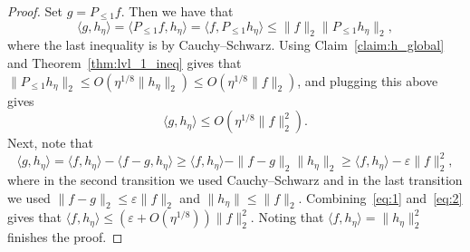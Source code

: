 \documentclass[11pt]{article}
\newcommand\norm[1]{\| #1 \|}
\newcommand\inner[2]{\langle{#1},{#2}\rangle}
\newcommand\eps{\varepsilon}
\renewcommand\geq{\geqslant}
\renewcommand\leq{\leqslant}
\begin{document}
\begin{proof}
    Set $g=P_{\leq 1} f$. Then we have that
    \[
    \inner{g}{h_{\eta}}
    =\inner{P_{\leq 1} f}{h_{\eta}}
    =\inner{f}{P_{\leq 1} h_{\eta}}
    \leq \norm{f}_2\norm{P_{\leq 1}h_{\eta}}_2,
    \]
    where the last inequality is by Cauchy--Schwarz. Using Claim~\ref{claim:h_global} and Theorem~\ref{thm:lvl_1_ineq} gives that 
    $\norm{P_{\leq 1}h_{\eta}}_2\leq O(\eta^{1/8}\norm{h_{\eta}}_2)
    \leq O(\eta^{1/8}\norm{f}_2)$, and plugging this above gives
    \begin{equation}\label{eq:1}
    \inner{g}{h_{\eta}}\leq 
    O\left(\eta^{1/8}\norm{f}_2^2\right).
    \end{equation}
    Next, note that
    \begin{equation}\label{eq:2}
    \inner{g}{h_{\eta}}
    = 
    \inner{f}{h_{\eta}}
    -
    \inner{f-g}{h_{\eta}}
    \geq 
    \inner{f}{h_{\eta}}
    -\norm{f-g}_2\norm{h_{\eta}}_2
    \geq 
    \inner{f}{h_{\eta}}
    -\eps \norm{f}_2^2,
    \end{equation}
    where in the second transition we used Cauchy--Schwarz and in the last transition we used 
    $\norm{f-g}_2\leq \eps \norm{f}_2$ and $\norm{h_{\eta}}\leq \norm{f}_2$. Combining~\eqref{eq:1} and~\eqref{eq:2} gives that 
    $\inner{f}{h_{\eta}}\leq (\eps+O(\eta^{1/8}))\norm{f}_2^2$. Noting that $\inner{f}{h_{\eta}}=\norm{h_{\eta}}_2^2$ finishes the proof.
\end{proof}
\end{document}
